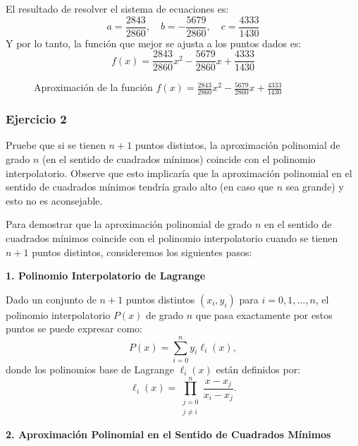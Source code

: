 \documentclass{article}
\begin{document}
El resultado de resolver el sistema de ecuaciones es:
\begin{equation}
    a = \frac{2843}{2860}, \quad b = -\frac{5679}{2860}, \quad c = \frac{4333}{1430}
\end{equation}
Y por lo tanto, la función que mejor se ajusta a los puntos dados es:
\begin{equation}
    f(x) = \frac{2843}{2860}x^2 - \frac{5679}{2860}x + \frac{4333}{1430}
\end{equation}
\begin{figure}[h]
    \centering
    \caption{Aproximación de la función $f(x) = \frac{2843}{2860}x^2 - \frac{5679}{2860}x + \frac{4333}{1430}$}
    \label{fig:myplot3}
\end{figure}
\subsubsection{Ejercicio 2}
Pruebe que si se tienen $n+1$ puntos distintos, la aproximación polinomial de grado $n$ (en el sentido de cuadrados mínimos)  coincide con el polinomio interpolatorio. Observe que esto implicaría que la aproximación polinomial en el sentido de cuadrados mínimos tendría grado alto (en caso que $n$ sea grande) y esto no es aconsejable.

Para demostrar que la aproximación polinomial de grado \( n \) en el sentido de cuadrados mínimos coincide con el polinomio interpolatorio cuando se tienen \( n+1 \) puntos distintos, consideremos los siguientes pasos:
\begin{center}
    \textbf{1. Polinomio Interpolatorio de Lagrange}
\end{center}

Dado un conjunto de \( n+1 \) puntos distintos \((x_i, y_i)\) para \( i = 0, 1, \ldots, n \), el polinomio interpolatorio \( P(x) \) de grado \( n \) que pasa exactamente por estos puntos se puede expresar como:
\[
P(x) = \sum_{i=0}^{n} y_i \ell_i(x),
\]
donde los polinomios base de Lagrange \( \ell_i(x) \) están definidos por:
\[
\ell_i(x) = \prod_{\substack{j=0 \\ j \neq i}}^{n} \frac{x - x_j}{x_i - x_j}.
\]
\newpage
\begin{center}
    \textbf{2. Aproximación Polinomial en el Sentido de Cuadrados Mínimos}
\end{center}
\end{document}
